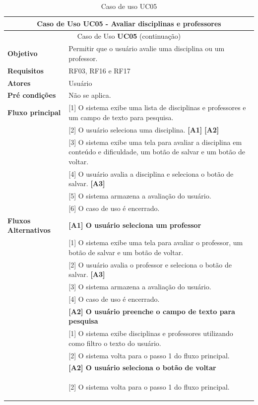 \begin{longtable}{ | m{} | m{} | }
    \hline\hline
    \multicolumn{2}{|c|}{Caso de Uso \textbf{UC05} - Avaliar disciplinas e professores}\tabularnewline\hline\hline\endfirsthead
    \hline\hline
    \multicolumn{2}{|c|}{Caso de Uso \textbf{UC05} (continuação)}\tabularnewline\hline\hline\endhead
    \hline\endfoot
    \hline\caption{Caso de uso UC05}\endlastfoot

    \textbf{Objetivo} & Permitir que o usuário avalie uma disciplina ou um professor.\tabularnewline\hline
    \textbf{Requisitos} & RF03, RF16 e RF17\tabularnewline\hline
    \textbf{Atores} & Usuário\tabularnewline\hline
    \textbf{Pré condições} & Não se aplica.\tabularnewline\hline

    \multirow{1}{*}{\textbf{Fluxo principal}} & [1] O sistema exibe uma lista de disciplinas e professores e um campo de texto para pesquisa.\tabularnewline\cline{2-2}
    & [2] O usuário seleciona uma disciplina. \textbf{[A1]} \textbf{[A2]}\tabularnewline\cline{2-2}
    & [3] O sistema exibe uma tela para avaliar a disciplina em conteúdo e dificuldade, um botão de salvar e um botão de voltar.\tabularnewline\cline{2-2}
    & [4] O usuário avalia a disciplina e seleciona o botão de salvar. \textbf{[A3]}\tabularnewline\cline{2-2}
    & [5] O sistema armazena a avaliação do usuário.\tabularnewline\cline{2-2}
    & [6] O caso de uso é encerrado.\tabularnewline\hline

    \multirow{1}{*}{\textbf{Fluxos Alternativos}} & \textbf{[A1] O usuário seleciona um professor}\tabularnewline\cline{2-2}
    & [1] O sistema exibe uma tela para avaliar o professor, um botão de salvar e um botão de voltar.\tabularnewline\cline{2-2}
    & [2] O usuário avalia o professor e seleciona o botão de salvar. \textbf{[A3]}\tabularnewline\cline{2-2} 
    & [3] O sistema armazena a avaliação do usuário.\tabularnewline\cline{2-2}
    & [4] O caso de uso é encerrado.\tabularnewline\cline{2-2}

    & \textbf{[A2] O usuário preenche o campo de texto para pesquisa}\tabularnewline\cline{2-2}
    & [1] O sistema exibe disciplinas e professores utilizando como filtro o texto do usuário.\tabularnewline\cline{2-2}
    & [2] O sistema volta para o passo 1 do fluxo principal.\tabularnewline\cline{2-2}

    & \textbf{[A2] O usuário seleciona o botão de voltar}\tabularnewline\cline{2-2}
    & [2] O sistema volta para o passo 1 do fluxo principal. %

    \label{tab:uc05}
\end{longtable}


